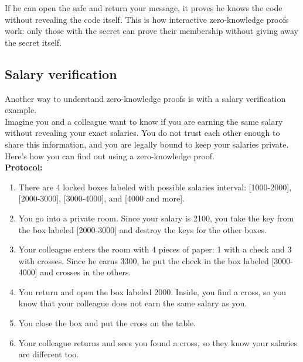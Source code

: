 If he can open the safe and return your message, it proves he knows the code without revealing the code itself. This is how interactive zero-knowledge proofs work: only those with the secret can prove their membership without giving away the secret itself.

\subsection{Salary verification}

Another way to understand zero-knowledge proofs is with a salary verification example.
\\
Imagine you and a colleague want to know if you are earning the same salary without revealing your exact salaries. You do not trust each other enough to share this information, and you are legally bound to keep your salaries private. Here's how you can find out using a zero-knowledge proof.
\\
\textbf{Protocol:}
\begin{enumerate}
    \item There are 4 locked boxes labeled with possible salaries interval: [1000-2000], [2000-3000], [3000-4000], and [4000 and more].
    \item You go into a private room. Since your salary is 2100, you take the key from the box labeled [2000-3000] and destroy the keys for the other boxes.
    \item Your colleague enters the room with 4 pieces of paper: 1 with a check and 3 with crosses. Since he earns 3300, he put the check in the box labeled [3000-4000] and crosses in the others.
    \item You return and open the box labeled 2000. Inside, you find a cross, so you know that your colleague does not earn the same salary as you.
    \item You close the box and put the cross on the table.
    \item Your colleague returns and sees you found a cross, so they know your salaries are different too.
\end{enumerate}
